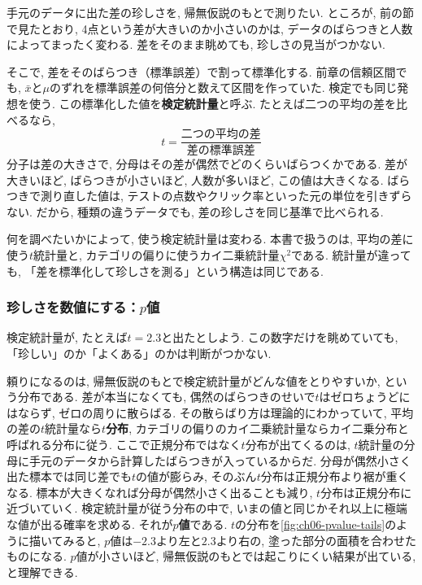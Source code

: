     手元のデータに出た差の珍しさを, 帰無仮説のもとで測りたい.
    ところが, 前の節で見たとおり, 4点という差が大きいのか小さいのかは, データのばらつきと人数によってまったく変わる.
    差をそのまま眺めても, 珍しさの見当がつかない.

    そこで, 差をそのばらつき（標準誤差）で割って標準化する.
    前章の信頼区間でも, $\bar{x}$と$\mu$のずれを標準誤差の何倍分と数えて区間を作っていた.
    検定でも同じ発想を使う.
    この標準化した値を\textbf{検定統計量}と呼ぶ.
    たとえば二つの平均の差を比べるなら,
    \[
      t = \frac{\text{二つの平均の差}}{\text{差の標準誤差}}
    \]
    分子は差の大きさで, 分母はその差が偶然でどのくらいばらつくかである.
    差が大きいほど, ばらつきが小さいほど, 人数が多いほど, この値は大きくなる.
    ばらつきで測り直した値は, テストの点数やクリック率といった元の単位を引きずらない.
    だから, 種類の違うデータでも, 差の珍しさを同じ基準で比べられる.

    何を調べたいかによって, 使う検定統計量は変わる.
    本書で扱うのは, 平均の差に使う$t$統計量と, カテゴリの偏りに使うカイ二乗統計量$\chi^2$である.
    統計量が違っても, 「差を標準化して珍しさを測る」という構造は同じである.

    \subsubsection*{珍しさを数値にする：\texorpdfstring{$p$}{p}値}

    検定統計量が, たとえば$t = 2.3$と出たとしよう.
    この数字だけを眺めていても, 「珍しい」のか「よくある」のかは判断がつかない.

    頼りになるのは, 帰無仮説のもとで検定統計量がどんな値をとりやすいか, という分布である.
    差が本当になくても, 偶然のばらつきのせいで$t$はゼロちょうどにはならず, ゼロの周りに散らばる.
    その散らばり方は理論的にわかっていて, 平均の差の$t$統計量なら\textbf{$t$分布}, カテゴリの偏りのカイ二乗統計量ならカイ二乗分布と呼ばれる分布に従う.
    ここで正規分布ではなく$t$分布が出てくるのは, $t$統計量の分母に手元のデータから計算したばらつきが入っているからだ.
    分母が偶然小さく出た標本では同じ差でも$t$の値が膨らみ, そのぶん$t$分布は正規分布より裾が重くなる.
    標本が大きくなれば分母が偶然小さく出ることも減り, $t$分布は正規分布に近づいていく.
    検定統計量が従う分布の中で, いまの値と同じかそれ以上に極端な値が出る確率を求める.
    それが\textbf{$p$値}である.
    $t$の分布を\cref{fig:ch06-pvalue-tails}のように描いてみると, $p$値は$-2.3$より左と$2.3$より右の, 塗った部分の面積を合わせたものになる.
    $p$値が小さいほど, 帰無仮説のもとでは起こりにくい結果が出ている, と理解できる.

